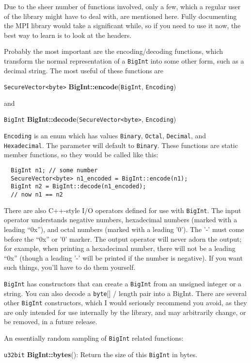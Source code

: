 \documentclass{article}
\newcommand{\function}[1]{\textbf{#1}}
\newcommand{\type}[1]{\texttt{#1}}
\begin{document}
Due to the sheer number of functions involved, only a few, which a regular user
of the library might have to deal with, are mentioned here. Fully documenting
the MPI library would take a significant while, so if you need to use it now,
the best way to learn is to look at the headers.

Probably the most important are the encoding/decoding functions, which
transform the normal representation of a \type{BigInt} into some other form,
such as a decimal string. The most useful of these functions are

\type{SecureVector<byte>} \function{BigInt::encode}(\type{BigInt},
\type{Encoding})

\noindent
and

\type{BigInt} \function{BigInt::decode}(\type{SecureVector<byte>},
\type{Encoding})

\type{Encoding} is an enum which has values \type{Binary}, \type{Octal},
\type{Decimal}, and \type{Hexadecimal}. The parameter will default to
\type{Binary}. These functions are static member functions, so they would be
called like this:

\begin{verbatim}
  BigInt n1; // some number
  SecureVector<byte> n1_encoded = BigInt::encode(n1);
  BigInt n2 = BigInt::decode(n1_encoded);
  // now n1 == n2
\end{verbatim}

There are also C++-style I/O operators defined for use with \type{BigInt}. The
input operator understands negative numbers, hexadecimal numbers (marked with a
leading ``0x''), and octal numbers (marked with a leading '0'). The '-' must
come before the ``0x'' or '0' marker. The output operator will never adorn the
output; for example, when printing a hexadecimal number, there will not be a
leading ``0x'' (though a leading '-' will be printed if the number is
negative). If you want such things, you'll have to do them yourself.

\type{BigInt} has constructors that can create a \type{BigInt} from an unsigned
integer or a string. You can also decode a \type{byte}[] / length pair into a
BigInt. There are several other \type{BigInt} constructors, which I would
seriously recommend you avoid, as they are only intended for use internally by
the library, and may arbitrarily change, or be removed, in a future release.

An essentially random sampling of \type{BigInt} related functions:

\type{u32bit} \function{BigInt::bytes}(): Return the size of this \type{BigInt}
in bytes.
\end{document}
